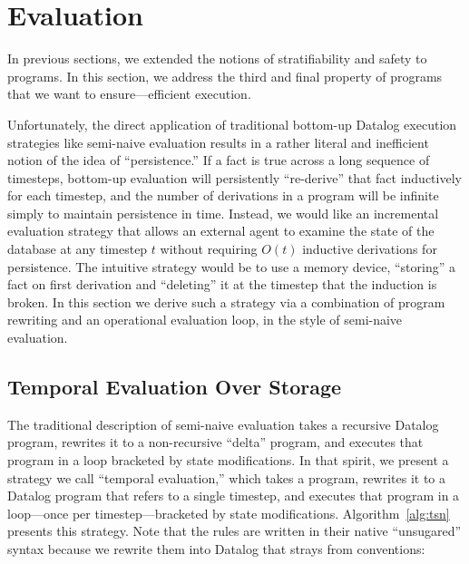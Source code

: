 \section{Evaluation}
\label{sec:eval}
In previous sections, we extended the notions of stratifiability and safety to \slang programs.  In this section, we address the third and final property of \slang programs that we want to ensure---efficient execution.

Unfortunately, the direct application of traditional bottom-up Datalog
execution strategies like semi-naive evaluation results in a rather literal and
inefficient notion of the idea of ``persistence.''  If a fact is true across a
long sequence of timesteps, bottom-up evaluation will persistently
``re-derive'' that fact inductively for each timestep, and the number of
derivations in a program will be infinite simply to maintain persistence in
time.  Instead, we would like an incremental evaluation strategy that allows an
external agent to examine the state of the database at any timestep $t$ without
requiring $O(t)$ inductive derivations for persistence.  The intuitive strategy
would be to use a memory device, ``storing'' a fact on first derivation and
``deleting'' it at the timestep that the induction is broken.  In this section
we derive such a strategy via a combination of program rewriting and an
operational evaluation loop, in the style of semi-naive evaluation.

\subsection{Temporal Evaluation Over Storage}
The traditional description of semi-naive evaluation takes a recursive Datalog program, rewrites it to a non-recursive ``delta'' program, and executes that program in a loop bracketed by state modifications.  In that spirit, we present a strategy we call ``temporal evaluation,'' which takes a \slang program, rewrites it to a Datalog program that refers to a single timestep, and executes that program in a loop---once per timestep---bracketed by state modifications.  Algorithm~\ref{alg:tsn} presents this strategy.  Note that the \slang rules are written in their native ``unsugared'' syntax because we rewrite them into Datalog that strays from \slang conventions:

